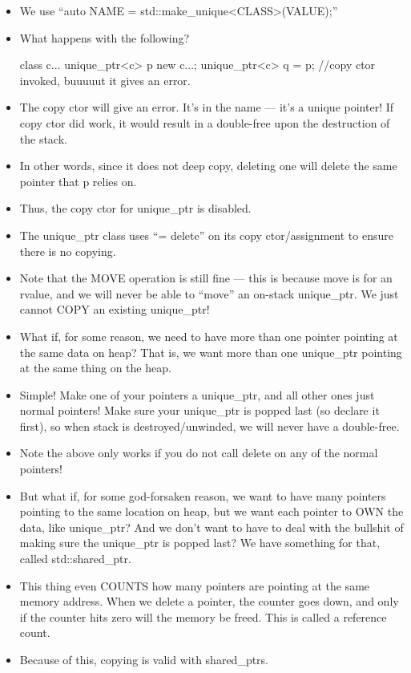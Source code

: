 \documentclass{article}
\begin{document}
\begin{itemize}
\item We use ``auto NAME = std::make_unique<CLASS>(VALUE);''
\item What happens with the following?
\begin{itemize}
class c{...}
unique_ptr<c> p {new c{...}};
unique_ptr<c> q = p; //copy ctor invoked, buuuuut it gives an error.
\end{itemize}
\item The copy ctor will give an error.  It's in the name --- it's a unique pointer!  If copy ctor did work, it would result in a double-free upon the destruction of the stack.
\item In other words, since it does not deep copy, deleting one will delete the same pointer that p relies on.
\item Thus, the copy ctor for unique_ptr is disabled.
\item The unique_ptr class uses ``= delete'' on its copy ctor/assignment to ensure there is no copying.
\item Note that the MOVE operation is still fine --- this is because move is for an rvalue, and we will never be able to ``move'' an on-stack unique_ptr.  We just cannot COPY an existing unique_ptr!
\item What if, for some reason, we need to have more than one pointer pointing at the same data on heap?  That is, we want more than one unique_ptr pointing at the same thing on the heap.
\item Simple!  Make one of your pointers a unique_ptr, and all other ones just normal pointers!  Make sure your unique_ptr is popped last (so declare it first), so when stack is destroyed/unwinded, we will never have a double-free.
\item Note the above only works if you do not call delete on any of the normal pointers!  
\item But what if, for some god-forsaken reason, we want to have many pointers pointing to the same location on heap, but we want each pointer to OWN the data, like unique_ptr?  And we don't want to have to deal with the bullshit of making sure the unique_ptr is popped last?  We have something for that, called std::shared_ptr.
\item This thing even COUNTS how many pointers are pointing at the same memory address.  When we delete a pointer, the counter goes down, and only if the counter hits zero will the memory be freed.  This is called a reference count.
\item Because of this, copying is valid with shared_ptrs.

\end{itemize}
\end{document}
